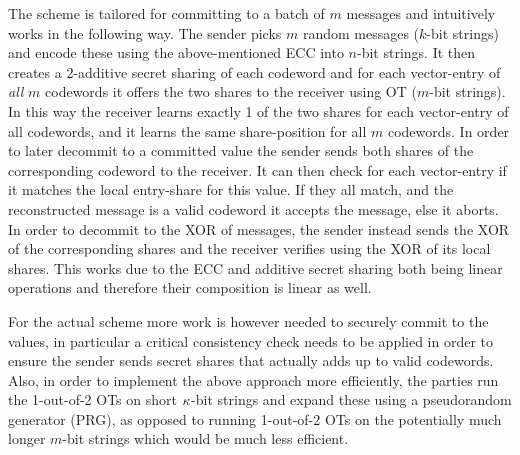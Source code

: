 The \cite{DBLP:conf/tcc/FrederiksenJNT16} scheme is tailored for committing to a batch of $m$ messages and intuitively works in the following way. The sender picks $m$ random messages ($k$-bit strings) and encode these using the above-mentioned ECC into $n$-bit strings. It then creates a 2-additive secret sharing of each codeword and for each vector-entry of \textit{all} $m$ codewords it offers the two shares to the receiver using OT ($m$-bit strings). In this way the receiver learns exactly 1 of the two shares for each vector-entry of all codewords, and it learns the same share-position for all $m$ codewords. In order to later decommit to a committed value the sender sends both shares of the corresponding codeword to the receiver. It can then check for each vector-entry if it matches the local entry-share for this value. If they all match, and the reconstructed message is a valid codeword it accepts the message, else it aborts. In order to decommit to the XOR of messages, the sender instead sends the XOR of the corresponding shares and the receiver verifies using the XOR of its local shares. This works due to the ECC and additive secret sharing both being linear operations and therefore their composition is linear as well. 

For the actual scheme more work is however needed to securely commit to the values, in particular a critical consistency check needs to be applied in order to ensure the sender sends secret shares that actually adds up to valid codewords. Also, in order to implement the above approach more efficiently, the parties run the 1-out-of-2 OTs on short $\kappa$-bit strings and expand these using a pseudorandom generator (PRG), as opposed to running 1-out-of-2 OTs on the potentially much longer $m$-bit strings which would be much less efficient.